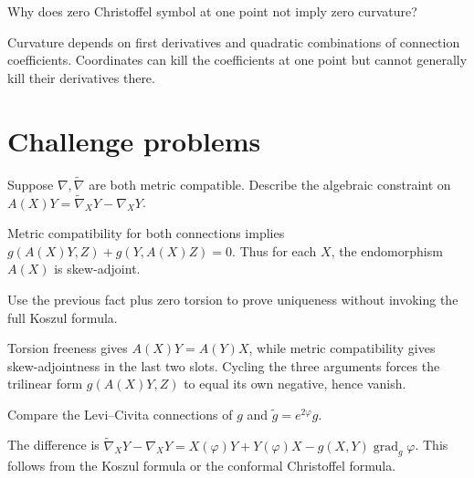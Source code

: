 \begin{problem}\label{prob:vii22-12}
Why does zero Christoffel symbol at one point not imply zero curvature?
\end{problem}
\begin{solution}
Curvature depends on first derivatives and quadratic combinations of connection coefficients. Coordinates can kill the coefficients at one point but cannot generally kill their derivatives there.
\end{solution}

\section{Challenge problems}

\begin{problem}\label{prob:vii22-ch01}
Suppose \(\nabla,\widetilde\nabla\) are both metric compatible. Describe the algebraic constraint on \(A(X)Y=\widetilde\nabla_XY-\nabla_XY\).
\end{problem}
\begin{solution}
Metric compatibility for both connections implies \(g(A(X)Y,Z)+g(Y,A(X)Z)=0\). Thus for each \(X\), the endomorphism \(A(X)\) is skew-adjoint.
\end{solution}


\begin{problem}\label{prob:vii22-ch02}
Use the previous fact plus zero torsion to prove uniqueness without invoking the full Koszul formula.
\end{problem}
\begin{solution}
Torsion freeness gives \(A(X)Y=A(Y)X\), while metric compatibility gives skew-adjointness in the last two slots. Cycling the three arguments forces the trilinear form \(g(A(X)Y,Z)\) to equal its own negative, hence vanish.
\end{solution}


\begin{problem}\label{prob:vii22-ch03}
Compare the Levi--Civita connections of \(g\) and \(\widetilde g=e^{2\varphi}g\).
\end{problem}
\begin{solution}
The difference is \(\widetilde\nabla_XY-\nabla_XY=X(\varphi)Y+Y(\varphi)X-g(X,Y)\operatorname{grad}_g\varphi\). This follows from the Koszul formula or the conformal Christoffel formula.
\end{solution}


